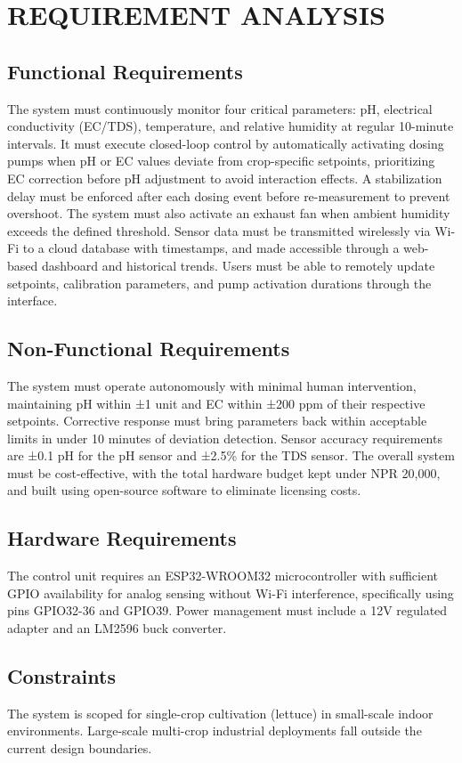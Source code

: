 \chapter{REQUIREMENT ANALYSIS}
\section{Functional Requirements}
The system must continuously monitor four critical parameters: pH, electrical conductivity (EC/TDS), temperature, and relative humidity at regular 10-minute intervals. It must execute closed-loop control by automatically activating dosing pumps when pH or EC values deviate from crop-specific setpoints, prioritizing EC correction before pH adjustment to avoid interaction effects. A stabilization delay must be enforced after each dosing event before re-measurement to prevent overshoot. The system must also activate an exhaust fan when ambient humidity exceeds the defined threshold.
Sensor data must be transmitted wirelessly via Wi-Fi to a cloud database with timestamps, and made accessible through a web-based dashboard and historical trends. Users must be able to remotely update setpoints, calibration parameters, and pump activation durations through the interface.
 
\section{Non-Functional Requirements}
The system must operate autonomously with minimal human intervention, maintaining pH within ±1 unit and EC within ±200 ppm of their respective setpoints. Corrective response must bring parameters back within acceptable limits in under 10 minutes of deviation detection. Sensor accuracy requirements are ±0.1 pH for the pH sensor and ±2.5\% for the TDS sensor. The overall system must be cost-effective, with the total hardware budget kept under NPR 20,000, and built using open-source software to eliminate licensing costs.
 
\section{Hardware Requirements}
The control unit requires an ESP32-WROOM32 microcontroller with sufficient GPIO availability for analog sensing without Wi-Fi interference, specifically using pins GPIO32-36 and GPIO39. Power management must include a 12V regulated adapter and an LM2596 buck converter.

\section{Constraints}
The system is scoped for single-crop cultivation (lettuce) in small-scale indoor environments. Large-scale multi-crop industrial deployments fall outside the current design boundaries.







